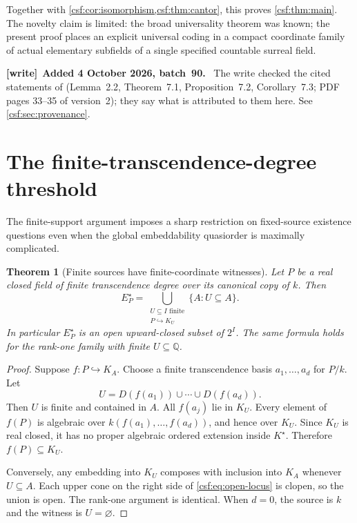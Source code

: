 \documentclass[11pt,a4paper]{article}
\numberwithin{equation}{section}
\newtheorem{theorem}{Theorem}[section]
\theoremstyle{definition}
\theoremstyle{remark}
\newcommand{\Q}{\mathbb Q}
\newcommand{\emb}{\hookrightarrow}
\newcommand{\Kstar}{K^{\star}}
\newenvironment{writenote}[1][]{\par\smallskip\begingroup\small\raggedright
 \setlength{\parindent}{1.25em}\noindent\textbf{[write]}\if\relax\detokenize{#1}\relax\else~\textbf{#1.}\fi\ }%
 {\par\endgroup\smallskip}
\begin{document}
Together with \cref{csf:cor:isomorphism,csf:thm:cantor}, this proves
\cref{csf:thm:main}. The novelty claim is limited: the broad universality theorem
was known; the present proof places an explicit universal coding in a
compact coordinate family of actual elementary subfields of a single
specified countable surreal field.

\begin{writenote}[Added 4 October 2026, batch~90]
The write checked the cited statements of \cite{cmms} (Lemma~2.2, Theorem~7.1, Proposition~7.2, Corollary~7.3; PDF pages 33--35 of version~2); they say what is attributed to them here. See \cref{csf:sec:provenance}.
\end{writenote}

\section{The finite-transcendence-degree threshold}
\label{csf:sec:threshold}

The finite-support argument imposes a sharp restriction on fixed-source
existence questions even when the global embeddability quasiorder is
maximally complicated.

\begin{theorem}[Finite sources have finite-coordinate witnesses]
\label{csf:thm:finite-source}
Let $P$ be a real closed field of finite transcendence degree over its
canonical copy of $k$. Then
\begin{equation}
 E^\star_P=\bigcup_{\substack{U\subseteq I\text{ finite}\\P\emb K_U}}
             \{A:U\subseteq A\}.
 \label{csf:eq:open-locus}
\end{equation}
In particular $E^\star_P$ is an open upward-closed subset of $2^I$.
The same formula holds for the rank-one family with finite $U\subseteq\Q$.
\end{theorem}
\begin{proof}
Suppose $f:P\emb K_A$. Choose a finite transcendence basis
$a_1,\ldots,a_d$ for $P/k$. Let
\[
 U=D(f(a_1))\cup\cdots\cup D(f(a_d)).
\]
Then $U$ is finite and contained in $A$. All $f(a_j)$ lie in $K_U$.
Every element of $f(P)$ is algebraic over $k(f(a_1),\ldots,f(a_d))$, and
hence over $K_U$. Since $K_U$ is real closed, it has no proper algebraic
ordered extension inside $\Kstar$. Therefore $f(P)\subseteq K_U$.

Conversely, any embedding into $K_U$ composes with inclusion into $K_A$
whenever $U\subseteq A$. Each upper cone on the right side of
\eqref{csf:eq:open-locus} is clopen, so the union is open. The rank-one argument
is identical. When $d=0$, the source is $k$ and the witness is $U=\varnothing$.
\end{proof}
\end{document}
